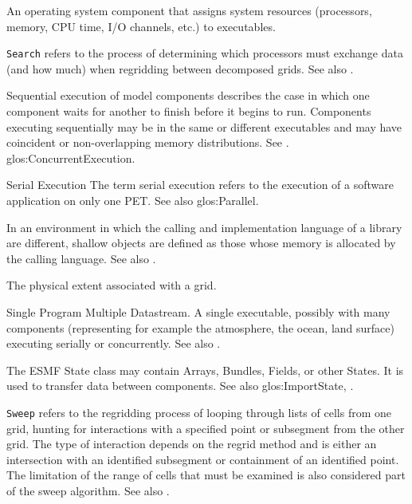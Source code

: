 \begin{description}
\label{glos:Scheduler} 
\item[Scheduler] 
  An operating system component 
  that assigns system resources (processors, memory, CPU time, 
  I/O channels, etc.) to executables.

\label{glos:Search} 
\item[Search]
  {\tt Search} refers to the process of determining which processors must
  exchange data (and how much) when regridding between decomposed grids.
  See also .

\label{glos:SequentialExecution}
\item[Sequential execution] 
  Sequential execution of model components describes the case in which 
  one component waits for another to finish before it begins
  to run.  Components executing sequentially may be in the same or 
  different executables and may have coincident or non-overlapping 
  memory distributions.  See .
  {glos:ConcurrentExecution}.

\label{glos:Serial}
\item{Serial Execution}
  The term serial execution refers to the execution of a software
  application on only one PET.  See also 
  {glos:Parallel}.

\label{glos:ShallowObjects} 
\item[Shallow object] 
  In an environment
  in which the calling and implementation language of a library are
  different, shallow objects are defined as those whose memory is 
  allocated by the calling language. 
  See also .

\label{glos:Span} 
\item[Span] 
  The physical extent associated with a grid.

\label{glos:SPMD} 
\item[SPMD] 
  Single Program Multiple Datastream. 
  A single executable, possibly with many components (representing 
  for example the atmosphere, the ocean, land surface) executing 
  serially or concurrently. See also . 

\label{glos:State} 
\item [State] 
  The ESMF State class may 
  contain Arrays, Bundles, Fields, or other States.  It is used to 
  transfer data between components.  See also 
  {glos:ImportState}, .

\label{glos:Sweep} 
\item[Sweep]
  {\tt Sweep} refers to the regridding process of looping through lists of cells
  from one grid, hunting for interactions with a specified point or subsegment
  from the other grid.  The type of interaction depends on the regrid method
  and is either an intersection with an identified subsegment or containment
  of an identified point.  The limitation of the range of cells that must be
  examined is also considered part of the sweep algorithm.
  See also .


\end{description}
